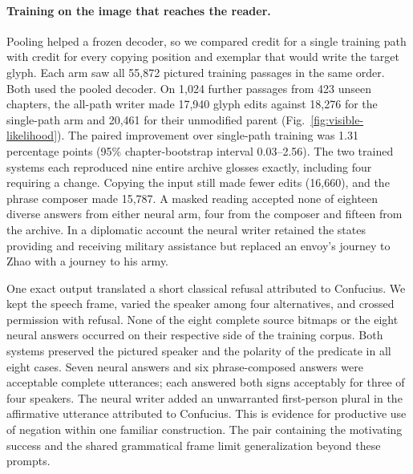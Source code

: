\documentclass[12pt,a4paper]{article}
\providecommand{\DIFadd}[1]{{\protect\color{blue} \sf #1}} %
\begin{document}
\paragraph{\DIFadd{Training on the image that reaches the reader.}}
\DIFadd{Pooling helped a frozen decoder, so we compared credit for a single training path with credit for every copying position and exemplar that would write the target glyph. Each arm saw all 55,872 pictured training passages in the same order. Both used the pooled decoder. On 1,024 further passages from 423 unseen chapters, the all-path writer made 17,940 glyph edits against 18,276 for the single-path arm and 20,461 for their unmodified parent (Fig.~\ref{fig:visible-likelihood}). The paired improvement over single-path training was 1.31 percentage points (95\% chapter-bootstrap interval 0.03--2.56). The two trained systems each reproduced nine entire archive glosses exactly, including four requiring a change. Copying the input still made fewer edits (16,660), and the phrase composer made 15,787. A masked reading accepted none of eighteen diverse answers from either neural arm, four from the composer and fifteen from the archive. In a diplomatic account the neural writer retained the states providing and receiving military assistance but replaced an envoy's journey to Zhao with a journey to his army.
}

\DIFadd{One exact output translated a short classical refusal attributed to Confucius. We kept the speech frame, varied the speaker among four alternatives, and crossed permission with refusal. None of the eight complete source bitmaps or the eight neural answers occurred on their respective side of the training corpus. Both systems preserved the pictured speaker and the polarity of the predicate in all eight cases. Seven neural answers and six phrase-composed answers were acceptable complete utterances; each answered both signs acceptably for three of four speakers. The neural writer added an unwarranted first-person plural in the affirmative utterance attributed to Confucius. This is evidence for productive use of negation within one familiar construction. The pair containing the motivating success and the shared grammatical frame limit generalization beyond these prompts.
}
\end{document}
